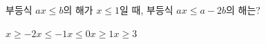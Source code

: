 부등식 $ax\le b$의 해가 $x\le 1$일 때, 부등식 $ax\le a-2b$의 해는? 
\begin{choices32}{$x\ge -2$}{$x\le -1$}{$x\le 0$}{$x\ge 1$}{$x\ge 3$}\end{choices32}
